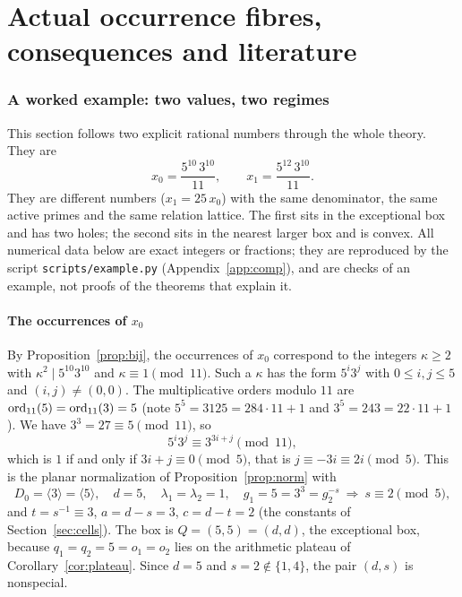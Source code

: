 \part{Actual occurrence fibres, consequences and literature}

\section{A worked example: two values, two regimes}\label{sec:example}

This section follows two explicit rational numbers through the whole theory. They are
\[
  x_0=\frac{5^{10}\,3^{10}}{11},\qquad x_1=\frac{5^{12}\,3^{10}}{11}.
\]
They are different numbers ($x_1=25\,x_0$) with the same denominator, the same active primes and the same relation lattice. The first sits in the exceptional box and has two holes; the second sits in the nearest larger box and is convex. All numerical data below are exact integers or fractions; they are reproduced by the script \texttt{scripts/example.py} (Appendix~\ref{app:comp}), and are checks of an example, not proofs of the theorems that explain it.

\subsection{\texorpdfstring{The occurrences of $x_0$}{The occurrences of x0}}

By Proposition~\ref{prop:bij}, the occurrences of $x_0$ correspond to the integers $\kappa\ge2$ with $\kappa^2\mid5^{10}3^{10}$ and $\kappa\equiv1\pmod{11}$. Such a $\kappa$ has the form $5^i3^j$ with $0\le i,j\le5$ and $(i,j)\ne(0,0)$. The multiplicative orders modulo $11$ are $\operatorname{ord}_{11}(5)=\operatorname{ord}_{11}(3)=5$ (note $5^5=3125=284\cdot11+1$ and $3^5=243=22\cdot11+1$). We have $3^3=27\equiv5\pmod{11}$, so
\[
  5^i3^j\equiv3^{3i+j}\pmod{11},
\]
which is $1$ if and only if $3i+j\equiv0\pmod5$, that is $j\equiv-3i\equiv2i\pmod5$. This is the planar normalization of Proposition~\ref{prop:norm} with
\[
  D_0=\langle3\rangle=\langle5\rangle,\quad d=5,\quad\lambda_1=\lambda_2=1,\quad g_1=5=3^3=g_2^{-s}\ \Longrightarrow\ s\equiv2\pmod5,
\]
and $t=s^{-1}\equiv3$, $a=d-s=3$, $c=d-t=2$ (the constants of Section~\ref{sec:cells}). The box is $Q=(5,5)=(d,d)$, the exceptional box, because $q_1=q_2=5=o_1=o_2$ lies on the arithmetic plateau of Corollary~\ref{cor:plateau}. Since $d=5$ and $s=2\notin\{1,4\}$, the pair $(d,s)$ is nonspecial.

